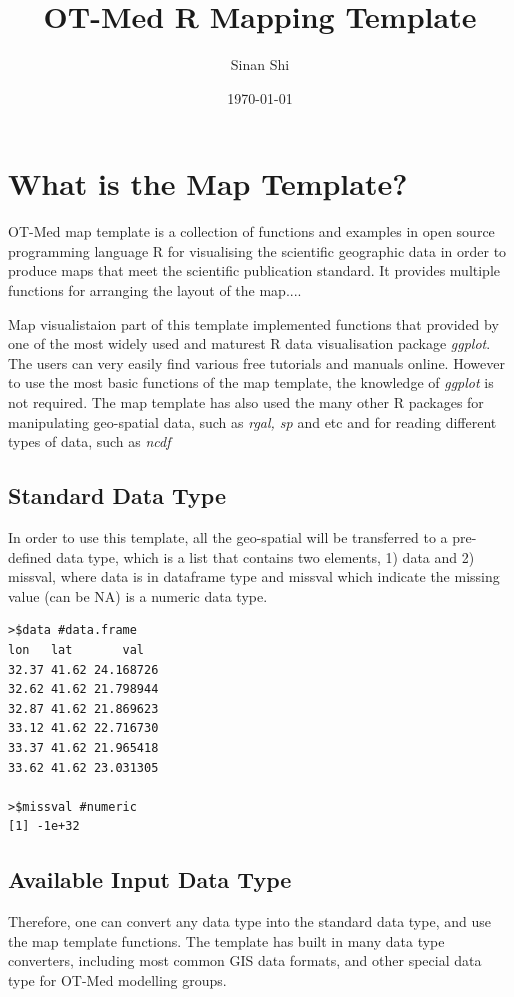 \documentclass[a4paper,10pt]{article}
\title{OT-Med R Mapping Template}
\author{Sinan Shi}
\date{\today}
\begin{document}
\maketitle
\tableofcontents
\newpage


\section{What is the Map Template?}
OT-Med map template is a collection of functions and examples in open source programming language R for visualising the scientific geographic data in order to produce maps that meet the scientific publication standard. It provides multiple functions for arranging the layout of the map....

Map visualistaion part of this template implemented functions that provided by one of the most widely used and maturest R data visualisation package \textit{ggplot}. The users can very easily find various free tutorials and manuals online. However to use the most basic functions of the map template, the knowledge of \textit{ggplot} is not required. The map template has also used the many other R packages for manipulating geo-spatial data, such as \textit{rgal, sp} and etc and for reading different types of data, such as \textit{ncdf}

\subsection{Standard Data Type}
In order to use this template, all the geo-spatial will be transferred to a pre-defined data type, which is a list that contains two elements, 1) data and 2) missval, where data is in dataframe type and missval which indicate the missing value (can be NA) is a numeric data type. 
\begin{lstlisting}
>$data #data.frame
lon	  lat		val
32.37 41.62 24.168726
32.62 41.62 21.798944
32.87 41.62 21.869623
33.12 41.62 22.716730
33.37 41.62 21.965418
33.62 41.62 23.031305

>$missval #numeric
[1] -1e+32
\end{lstlisting}

\subsection{Available Input Data Type}  
Therefore, one can convert any data type into the standard data type, and use the map template functions. The template has built in many data type converters, including most common GIS data formats, and other special data type for OT-Med modelling groups.
\end{document}
